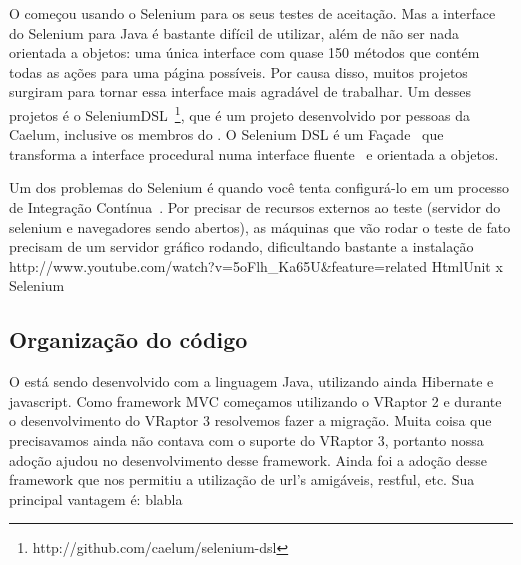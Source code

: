 O \calopsita começou usando o Selenium para os seus testes de aceitação. Mas a interface do Selenium para Java é bastante
difícil de utilizar, além de não ser nada orientada a objetos: uma única interface com quase 150 métodos que contém todas
as ações para uma página possíveis. Por causa disso, muitos projetos surgiram para tornar essa interface mais agradável
de trabalhar. Um desses projetos é o SeleniumDSL~\footnote{http://github.com/caelum/selenium-dsl}, que é um projeto 
\opensource desenvolvido por pessoas da Caelum, inclusive os membros do \calopsita. O Selenium DSL é um Façade~\cite{gof}
que transforma a interface procedural numa interface fluente~\cite{dsl} e orientada a objetos.

Um dos problemas do Selenium é quando você tenta configurá-lo em um processo de Integração Contínua~\cite{ci}. Por precisar
de recursos externos ao teste (servidor do selenium e navegadores sendo abertos), as máquinas que vão rodar o teste de fato
precisam de um servidor gráfico rodando, dificultando bastante a instalação
http://www.youtube.com/watch?v=5oFlh\_Ka65U\&feature=related
HtmlUnit x Selenium

\subsection{Organização do código}
O \calopsita está sendo desenvolvido com a linguagem Java, utilizando ainda Hibernate e javascript. Como 
framework MVC começamos utilizando o VRaptor 2 e durante o desenvolvimento do VRaptor 3 resolvemos fazer a migração. 
Muita coisa que precisavamos ainda não contava com o suporte do VRaptor 3, portanto nossa adoção ajudou no 
desenvolvimento desse framework. Ainda foi a adoção desse framework que nos permitiu a utilização de url's 
amigáveis, restful, etc. Sua principal vantagem é: blabla
